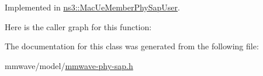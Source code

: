 Implemented in \hyperlink{classns3_1_1MacUeMemberPhySapUser_a21adda277318c6f99d9ad4764c3ce36c}{ns3\+::\+Mac\+Ue\+Member\+Phy\+Sap\+User}.



Here is the caller graph for this function\+:




The documentation for this class was generated from the following file\+:\begin{DoxyCompactItemize}
\item 
mmwave/model/\hyperlink{mmwave-phy-sap_8h}{mmwave-\/phy-\/sap.\+h}\end{DoxyCompactItemize}
